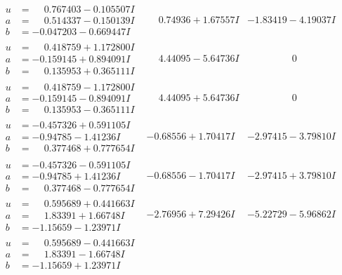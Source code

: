 \documentclass[1p]{elsarticle_modified}
\theoremstyle{definition}
\begin{document}
$$\begin{array}{c|c|c}
\begin{aligned}
u &= \phantom{-}0.767403 - 0.105507 I \\
a &= \phantom{-}0.514337 - 0.150139 I \\
b &= -0.047203 - 0.669447 I\end{aligned}
 & \phantom{-}0.74936 + 1.67557 I & -1.83419 - 4.19037 I \\ \hline\begin{aligned}
u &= \phantom{-}0.418759 + 1.172800 I \\
a &= -0.159145 + 0.894091 I \\
b &= \phantom{-}0.135953 + 0.365111 I\end{aligned}
 & \phantom{-}4.44095 - 5.64736 I & \phantom{-0.000000 } 0 \\ \hline\begin{aligned}
u &= \phantom{-}0.418759 - 1.172800 I \\
a &= -0.159145 - 0.894091 I \\
b &= \phantom{-}0.135953 - 0.365111 I\end{aligned}
 & \phantom{-}4.44095 + 5.64736 I & \phantom{-0.000000 } 0 \\ \hline\begin{aligned}
u &= -0.457326 + 0.591105 I \\
a &= -0.94785 - 1.41236 I \\
b &= \phantom{-}0.377468 + 0.777654 I\end{aligned}
 & -0.68556 + 1.70417 I & -2.97415 - 3.79810 I \\ \hline\begin{aligned}
u &= -0.457326 - 0.591105 I \\
a &= -0.94785 + 1.41236 I \\
b &= \phantom{-}0.377468 - 0.777654 I\end{aligned}
 & -0.68556 - 1.70417 I & -2.97415 + 3.79810 I \\ \hline\begin{aligned}
u &= \phantom{-}0.595689 + 0.441663 I \\
a &= \phantom{-}1.83391 + 1.66748 I \\
b &= -1.15659 - 1.23971 I\end{aligned}
 & -2.76956 + 7.29426 I & -5.22729 - 5.96862 I \\ \hline\begin{aligned}
u &= \phantom{-}0.595689 - 0.441663 I \\
a &= \phantom{-}1.83391 - 1.66748 I \\
b &= -1.15659 + 1.23971 I\end{aligned}

\end{array}$$
\end{document}
